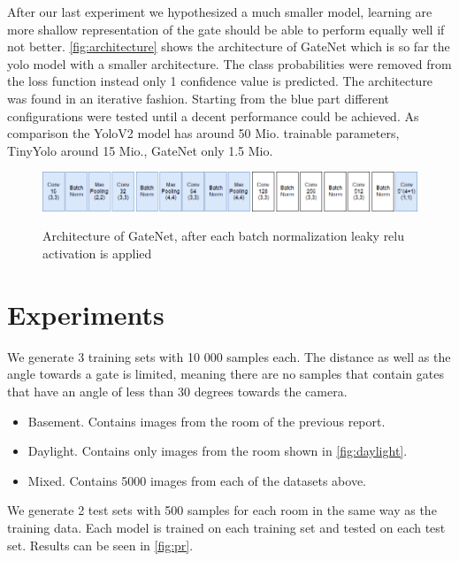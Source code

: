 \documentclass{article}
\begin{document}
After our last experiment we hypothesized a much smaller model, learning are more shallow representation of the gate should be able to perform equally well if not better. \autoref{fig:architecture} shows the architecture of GateNet which is so far the yolo model with a smaller architecture. The class probabilities were removed from the loss function instead only 1 confidence value is predicted. The architecture was found in an iterative fashion. Starting from the blue part different configurations were tested until a decent performance could be achieved. As comparison the YoloV2 model has around 50 Mio. trainable parameters, TinyYolo around 15 Mio., GateNet only 1.5 Mio.

\begin{figure}
	\centering
	\includegraphics[width=0.9\linewidth]{fig/architecture}
	\label{fig:architecture}
	\caption{Architecture of GateNet, after each batch normalization leaky relu activation is applied}
\end{figure}

\section{Experiments}

We generate 3 training sets with 10 000 samples each. The distance as well as the angle towards a gate is limited, meaning there are no samples that contain gates that have an angle of less than 30 degrees towards the camera.
\begin{itemize}
	\item Basement. Contains images from the room of the previous report.
	\item Daylight. Contains only images from the room shown in \autoref{fig:daylight}.
	\item Mixed. Contains 5000 images from each of the datasets above. 
\end{itemize}

We generate 2 test sets with 500 samples for each room in the same way as the training data. Each model is trained on each training set and tested on each test set. Results can be seen in \autoref{fig:pr}.
\end{document}

